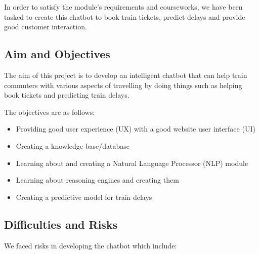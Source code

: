 \documentclass[11pt]{article}
\begin{document}
    In order to satisfy the module's requirements and courseworks, we have been tasked to create this chatbot to book train tickets, predict delays and provide good customer interaction. \citep{AI2020CW}

    \subsection{Aim and Objectives} 

    The aim of this project is to develop an intelligent chatbot that can help train commuters with various aspects of travelling by doing things such as helping book tickets and predicting train delays.

    The objectives are as follows:
    \begin{itemize}
        \item Providing good user experience (UX) with a good website user interface (UI)
        \item Creating a knowledge base/database
        \item Learning about and creating a Natural Language Processor (NLP) module
        \item Learning about reasoning engines and creating them
        \item Creating a predictive model for train delays
    \end{itemize}


    \subsection{Difficulties and Risks}

    We faced risks in developing the chatbot which include:
\end{document}
